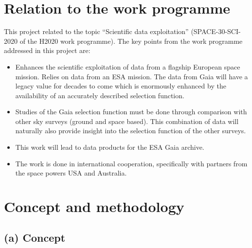 \section{Relation to the work programme}
\label{sec:relation-to-work-programme}

This project related to the topic ``Scientific data exploitation'' (SPACE-30-SCI-2020 of the H2020 work programme). The
key points from the work programme addressed in this project are:
\begin{itemize}
    \item Enhances the scientific exploitation of data from a flagship European space mission. Relies on data from an ESA
        mission. The data from Gaia will have a legacy value for decades to come which is enormously enhanced by the
        availability of an accurately described selection function.
    \item Studies of the Gaia selection function must be done through comparison with other sky surveys (ground and
        space based). This combination of data will naturally also provide insight into the selection function of the
        other surveys.
    \item This work will lead to data products for the ESA Gaia archive.
    \item The work is done in international cooperation, specifically with partners from the space powers USA and
        Australia.
\end{itemize}

\section{Concept and methodology}
\label{sec:conceptandmethods}
\subsection{(a) Concept}
\label{sec:concept}

